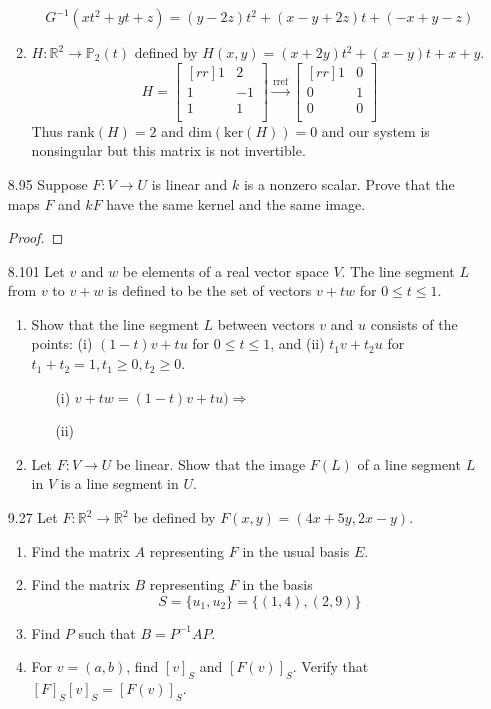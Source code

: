 \documentclass[12pt]{article}
\theoremstyle{definition}
\theoremstyle{plain}
\begin{document}
\begin{enumerate}
\begin{enumerate}
	\[ G^{-1}(xt^2+yt+z)=(y-2z)t^2+(x-y+2z)t+(-x+y-z) \]
	\item $H:\mathbb{R}^2\rightarrow\mathbb{P}_2(t)$ defined by $H(x,y)=(x+2y)t^2+(x-y)t+x+y$.
	\[ H=\begin{bmatrix}[rr]1&2\\1&-1\\1&1\\\end{bmatrix} \xrightarrow[]{\mathrm{rref}} \begin{bmatrix}[rr]1&0\\0&1\\0&0\\\end{bmatrix} \]
	Thus $\mathrm{rank}(H)=2$ and $\mathrm{dim}(\mathrm{ker}(H)) = 0$ and our system is nonsingular but this matrix is not invertible.
	\end{enumerate}

\item[8.95] Suppose $F:V\rightarrow U$ is linear and $k$ is a nonzero scalar. Prove that the maps $F$ and $kF$ have the same kernel and the same image.
	\begin{proof}
	
	\end{proof}

\item[8.101] Let $v$ and $w$ be elements of a real vector space $V$. The line segment $L$ from $v$ to $v+w$ is defined to be the set of vectors $v+tw$ for $0\leq t \leq 1$.
	\begin{enumerate}
	\item Show that the line segment $L$ between vectors $v$ and $u$ consists of the points: (i) $(1-t)v+tu$ for $0 \leq t \leq 1$, and (ii) $t_1v+t_2u$ for $t_1+t_2=1, t_1\geq 0, t_2\geq 0$.
		\begin{enumerate}
		\item[(i)] $v+tw = (1-t)v+tu) \Rightarrow $
		\item[(ii)]
		\end{enumerate}
	\item Let $F:V\rightarrow U$ be linear. Show that the image $F(L)$ of a line segment $L$ in $V$ is a line segment in $U$.
	\end{enumerate}

\item[9.27] Let $F:\mathbb{R}^2\rightarrow\mathbb{R}^2$ be defined by $F(x,y)=(4x+5y,2x-y)$.
	\begin{enumerate}
	\item Find the matrix $A$ representing $F$ in the usual basis $E$.
	\item Find the matrix $B$ representing $F$ in the basis
		\[ S=\{u_1,u_2\}=\{(1,4),(2,9)\} \]
	\item Find $P$ such that $B=P^{-1}AP$.
	\item For $v=(a,b)$, find $[v]_S$ and $[F(v)]_S$. Verify that $[F]_S[v]_S=[F(v)]_S$.
	\end{enumerate}
	

\end{enumerate}
\end{document}
